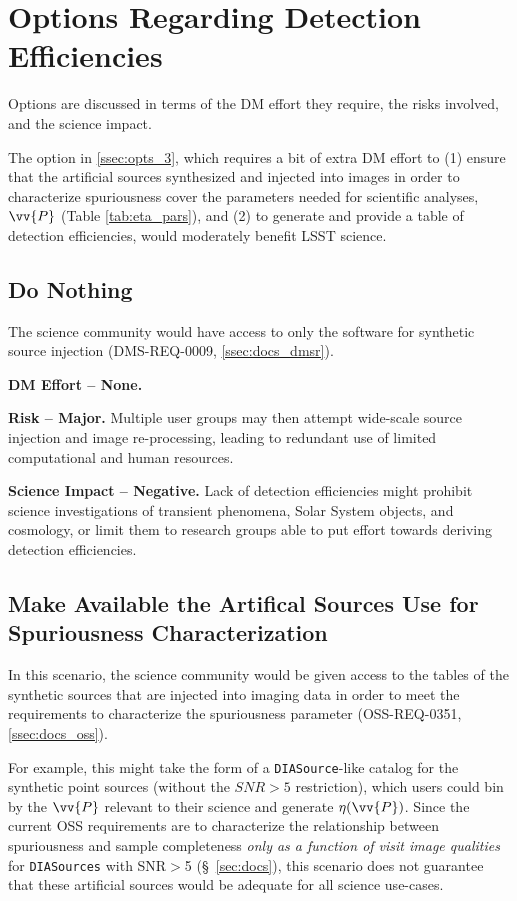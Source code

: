 \section{Options Regarding Detection Efficiencies} \label{sec:opts}

Options are discussed in terms of the DM effort they require, the risks involved, and the science impact. 

The option in \ref{ssec:opts_3}, which requires a bit of extra DM effort to (1) ensure that the artificial sources synthesized and injected into images in order to characterize spuriousness cover the parameters needed for scientific analyses, $\vv{P}$ (Table \ref{tab:eta_pars}), and (2) to generate and provide a table of detection efficiencies, would moderately benefit LSST science.


\subsection{Do Nothing}\label{ssec:opts_no}

The science community would have access to only the software for synthetic source injection (DMS-REQ-0009, \ref{ssec:docs_dmsr}).

{\bf DM Effort -- None.}

{\bf Risk -- Major.}
Multiple user groups may then attempt wide-scale source injection and image re-processing, leading to redundant use of limited computational and human resources. 

{\bf Science Impact -- Negative.}
Lack of detection efficiencies might prohibit science investigations of transient phenomena, Solar System objects, and cosmology, or limit them to research groups able to put effort towards deriving detection efficiencies.


\subsection{Make Available the Artifical Sources Use for Spuriousness Characterization}\label{ssec:opts_1}

In this scenario, the science community would be given access to the tables of the synthetic sources that are injected into imaging data in order to meet the requirements to characterize the spuriousness parameter (OSS-REQ-0351, \ref{ssec:docs_oss}).

For example, this might take the form of a {\tt DIASource}-like catalog for the synthetic point sources (without the $SNR>5$ restriction), which users could bin by the $\vv{P}$ relevant to their science and generate $\eta(\vv{P})$.
Since the current OSS requirements are to characterize the relationship between spuriousness and sample completeness {\it only as a function of visit image qualities} for {\tt DIASources} with SNR$>$5 (\S~\ref{sec:docs}), this scenario does not guarantee that these artificial sources would be adequate for all science use-cases. 

